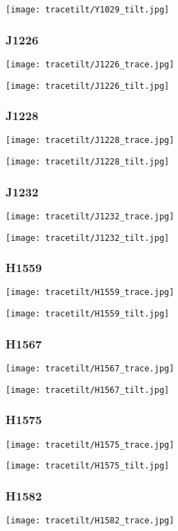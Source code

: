 \texttt{[image: tracetilt/Y1029\_tilt.jpg]}

\subsubsection*{J1226}
\texttt{[image: tracetilt/J1226\_trace.jpg]}

\texttt{[image: tracetilt/J1226\_tilt.jpg]}

\subsubsection*{J1228}
\texttt{[image: tracetilt/J1228\_trace.jpg]}

\texttt{[image: tracetilt/J1228\_tilt.jpg]}

\subsubsection*{J1232}
\texttt{[image: tracetilt/J1232\_trace.jpg]}

\texttt{[image: tracetilt/J1232\_tilt.jpg]}

\subsubsection*{H1559}
\texttt{[image: tracetilt/H1559\_trace.jpg]}

\texttt{[image: tracetilt/H1559\_tilt.jpg]}

\subsubsection*{H1567}
\texttt{[image: tracetilt/H1567\_trace.jpg]}

\texttt{[image: tracetilt/H1567\_tilt.jpg]}

\subsubsection*{H1575}
\texttt{[image: tracetilt/H1575\_trace.jpg]}

\texttt{[image: tracetilt/H1575\_tilt.jpg]}

\subsubsection*{H1582}
\texttt{[image: tracetilt/H1582\_trace.jpg]}

